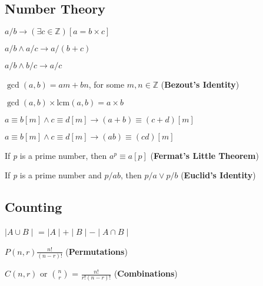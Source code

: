 \subsection{Number Theory}
\begin{symbollist}
    \item $a / b \rightarrow (\exists c \in \mathbb{Z})[a = b \times c]$
    \item $a / b \wedge a / c \rightarrow a / (b + c)$
    \item $a/ b \wedge b / c \rightarrow a / c $
    \item $\gcd(a, b) = am + bn$, for some $m, n \in \mathbb{Z}$
        (\textbf{Bezout's Identity})
    \item $\gcd(a, b) \times \mathrm{lcm}(a, b) = a \times b$
    \item $a \equiv b[m] \wedge c \equiv d[m] \rightarrow (a + b) \equiv (c +
        d)[m]$
    \item $a \equiv b[m] \wedge c \equiv d[m] \rightarrow (ab) \equiv
        (cd)[m]$
    \item If \emph{p} is a prime number, then $a^{p} \equiv a[p]$
        (\textbf{Fermat's Little Theorem})
    \item If \emph{p} is a prime number and $p / ab$, then $p / a \vee p / b$
        (\textbf{Euclid's Identity})
\end{symbollist}

\subsection{Counting}
\begin{symbollist}
    \item $\mid A \cup B \mid$ =  $\mid A \mid + \mid B \mid - \mid A \cap B
        \mid$
    \item $P(n,r) \frac{n!}{(n - r)!}$ (\textbf{Permutations})
    \item $C(n,r)$ or $\binom{n}{r}$ = $\frac{n!}{r!(n - r)!}$
        (\textbf{Combinations})
\end{symbollist}
